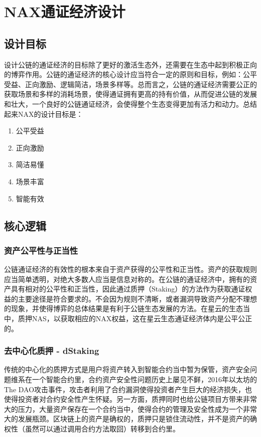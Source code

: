 \section{NAX通证经济设计}
\subsection{设计目标}
设计公链的通证经济的目标除了更好的激活生态外，还需要在生态中起到积极正向的博弈作用。公链的通证经济的核心设计应当符合一定的原则和目标，例如：公平受益、正向激励、逻辑简洁，场景多样等。总而言之，公链的通证经济需要公正的获取场景和多样的消耗场景，使得通证拥有更高的持有价值，从而促进公链的发展和壮大，一个良好的公链通证经济，会使得整个生态变得更加有活力和动力。总结起来NAX的设计目标是：

\begin{enumerate}[\hspace{2cm}(a)]
    \item 公平受益
    \item 正向激励
    \item 简洁易懂
    \item 场景丰富
    \item 智能有效
\end{enumerate}

\subsection{核心逻辑}

\subsubsection{资产公平性与正当性}
公链通证经济的有效性的根本来自于资产获得的公平性和正当性。资产的获取规则应当简单透明，对绝大多数人应当是信息对称的。在公链的通证经济中，拥有的资产具有相对的公平性和正当性，因此通过质押（Staking）的方法作为获取通证权益的主要途径是符合要求的。不会因为规则不清晰，或者漏洞导致资产分配不理想的现象，并使得博弈的总体结果是有利于公链生态发展的方法。在星云的生态当中，质押NAS，以获取相应的NAX权益，这在星云生态通证经济体内是公平公正的。

\subsubsection{去中心化质押 - dStaking}
传统的中心化的质押方式是用户将资产转入到智能合约当中暂为保管，资产安全问题维系在一个智能合约里，合约资产安全性问题历史上屡见不鲜，2016年以太坊的The DAO攻击事件，攻击者利用了合约漏洞使得投资者产生巨大的经济损失，也使得投资者对合约安全性产生怀疑。另一方面，质押同时也给公链项目方带来非常大的压力，大量资产保存在一个合约当中，使得合约的管理及安全性成为一个非常大的发展瓶颈。区块链上的资产是确权的，质押只是锁住流动性，并不是资产的确权性（虽然可以通过调用合约方法取回）转移到合约里。

